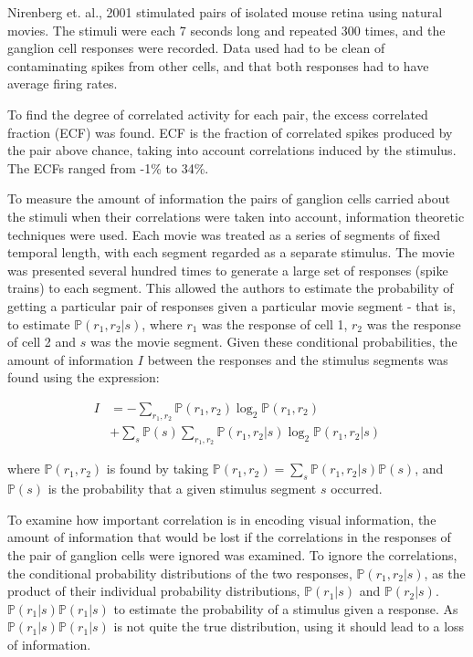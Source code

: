 \documentclass[twoside]{article}
\begin{document}
\begin{multicols}{2}
\normalsize
Nirenberg et. al., 2001 stimulated pairs of isolated mouse retina using natural movies. The stimuli were each 7 seconds long and repeated 300 times, and the ganglion cell responses were recorded. Data used had to be clean of contaminating spikes from other cells, and that both responses had to have average firing rates. 

To find the degree of correlated activity for each pair, the excess correlated fraction (ECF) was found. ECF is the fraction of correlated spikes produced by the pair above chance, taking into account correlations induced by the stimulus. The ECFs ranged from -1\% to 34\%. 

To measure the amount of information the pairs of ganglion cells carried about the stimuli when their correlations were taken into account, information theoretic techniques were used. Each movie was treated as a series of segments of fixed temporal length, with each segment regarded as a separate stimulus. The movie was presented several hundred times to generate a large set of responses (spike trains) to each segment. This allowed the authors to estimate the probability of getting a particular pair of responses given a particular movie segment - that is, to estimate $\mathbb{P}(r_1,r_2|s)$, where $r_1$ was the response of cell 1, $r_2$ was the response of cell 2 and $s$ was the movie segment. Given these conditional probabilities, the amount of information $I$ between the responses and the stimulus segments was found using the expression:


\begin{align}\label{eq:info-theory}
	I 
		&= -\sum_{r_1,r_2}\mathbb{P}(r_1,r_2)\log_2\mathbb{P}(r_1,r_2) \\
  		&+ \sum_s\mathbb{P}(s) \sum_{r_1,r_2}\mathbb{P}(r_1,r_2|s)\log_2\mathbb{P}(r_1,r_2|s)
\end{align}


where $\mathbb{P}(r_1,r_2)$ is found by taking $\mathbb{P}(r_1,r_2) = \sum_s \mathbb{P}(r_1,r_2|s)\mathbb{P}(s)$, and $\mathbb{P}(s)$ is the probability that a given stimulus segment $s$ occurred. 

To examine how important correlation is in encoding visual information, the amount of information that would be lost if the correlations in the responses of the pair of ganglion cells were ignored was examined. To ignore the correlations, the conditional probability distributions of the two responses, $\mathbb{P}(r_1,r_2|s)$, as the product of their individual probability distributions, $\mathbb{P}(r_1|s)$ and $\mathbb{P}(r_2|s)$. $\mathbb{P}(r_1|s)\mathbb{P}(r_1|s)$ to estimate the probability of a stimulus given a response. As $\mathbb{P}(r_1|s)\mathbb{P}(r_1|s)$ is not quite the true distribution, using it should lead to a loss of information. 


\end{multicols}
\end{document}
